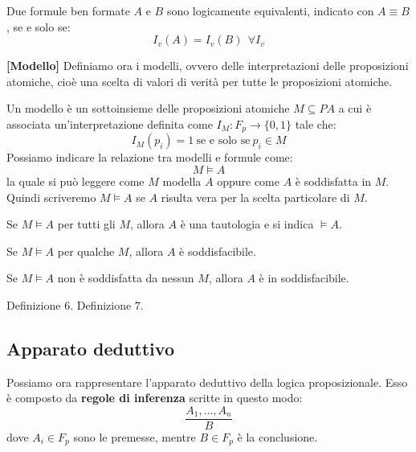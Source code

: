 \begin{definizione}
    Due formule ben formate $A$ e $B$ sono logicamente equivalenti, indicato con $A \equiv B$, se e solo se:
    \begin{equation}
        I_v(A) = I_v(B) \ \ \forall I_v
    \end{equation}
\end{definizione}
\begin{definizione}\textbf{[Modello]}
    Definiamo ora i modelli, ovvero delle interpretazioni delle proposizioni atomiche, cioè una scelta di valori di verità per tutte le proposizioni atomiche.
    
    Un modello è un sottoinsieme delle proposizioni atomiche $M \subseteq PA$ a cui è associata un'interpretazione definita come $I_M: F_p \to \{0, 1\}$ tale che:
    \begin{equation}
        I_M(p_i) = 1 \ \text{se e solo se} \ p_i \in M
    \end{equation}
    Possiamo indicare la relazione tra modelli e formule come:
    \begin{equation}
        M \models A
    \end{equation}
    la quale si può leggere come $M$ modella $A$ oppure come $A$ è soddisfatta in $M$. Quindi scriveremo $M \models A$ se $A$ risulta vera per la scelta particolare di $M$.
\end{definizione}
\begin{definizione}
     Se $M \models A$ per tutti gli $M$, allora $A$ è una tautologia e si indica $\models A$.
\end{definizione}
\begin{definizione}
    Se $M \models A$ per qualche $M$, allora $A$ è soddisfacibile.
\end{definizione}
\begin{definizione}
    Se $M \models A$ non è soddisfatta da nessun $M$, allora $A$ è in soddisfacibile.
\end{definizione}
Definizione 6. 
Definizione 7. 
\subsection{Apparato deduttivo}
Possiamo ora rappresentare l'apparato deduttivo della logica proposizionale. Esso è composto da \textbf{regole di inferenza} scritte in questo modo:
\begin{equation}
    \frac{A_1, \dots, A_n}{B}
\end{equation}
dove $A_i \in F_p$ sono le premesse, mentre $B \in F_p$ è la conclusione.

